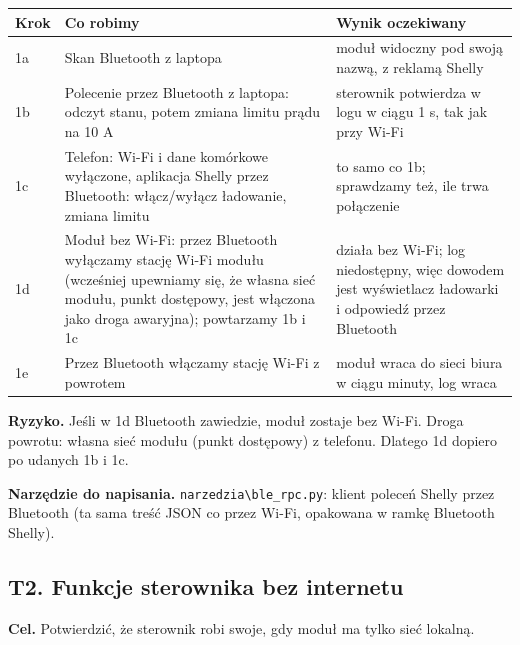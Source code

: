 \documentclass[11pt,a4paper]{article}
\begin{document}
\begin{longtable}{>{\raggedright\arraybackslash}p{3.00cm}>{\raggedright\arraybackslash}p{6.43cm}>{\raggedright\arraybackslash}p{5.85cm}}
\toprule
\rowcolor{apteallight}\textbf{Krok} & \textbf{Co robimy} & \textbf{Wynik oczekiwany} \\
\midrule\endhead
\bottomrule\endfoot
1a & Skan Bluetooth z laptopa & moduł widoczny pod swoją nazwą, z reklamą Shelly \\
1b & Polecenie przez Bluetooth z laptopa: odczyt stanu, potem zmiana limitu prądu na 10 A & sterownik potwierdza w logu w ciągu 1 s, tak jak przy Wi-Fi \\
1c & Telefon: Wi-Fi i dane komórkowe wyłączone, aplikacja Shelly przez Bluetooth: włącz/wyłącz ładowanie, zmiana limitu & to samo co 1b; sprawdzamy też, ile trwa połączenie \\
1d & Moduł bez Wi-Fi: przez Bluetooth wyłączamy stację Wi-Fi modułu (wcześniej upewniamy się, że własna sieć modułu, punkt dostępowy, jest włączona jako droga awaryjna); powtarzamy 1b i 1c & działa bez Wi-Fi; log niedostępny, więc dowodem jest wyświetlacz ładowarki i odpowiedź przez Bluetooth \\
1e & Przez Bluetooth włączamy stację Wi-Fi z powrotem & moduł wraca do sieci biura w ciągu minuty, log wraca \\
\end{longtable}

\textbf{Ryzyko.} Jeśli w 1d Bluetooth zawiedzie, moduł zostaje bez Wi-Fi. Droga powrotu: własna sieć modułu (punkt dostępowy) z telefonu. Dlatego 1d dopiero po udanych 1b i 1c.


\textbf{Narzędzie do napisania.} \texttt{narzedzia\textbackslash{}ble\_\allowbreak{}rpc.\allowbreak{}py}: klient poleceń Shelly przez Bluetooth (ta sama treść JSON co przez Wi-Fi, opakowana w ramkę Bluetooth Shelly).


\subsection{T2. Funkcje sterownika bez internetu}

\textbf{Cel.} Potwierdzić, że sterownik robi swoje, gdy moduł ma tylko sieć lokalną.
\end{document}
